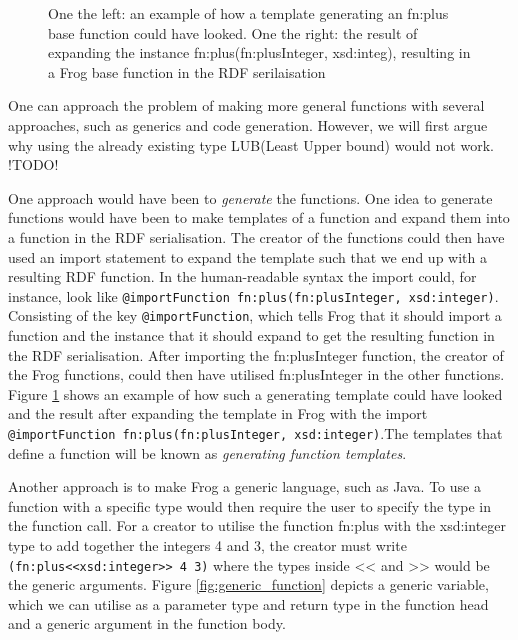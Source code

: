\begin{figure}
    \begin{minipage}{.5\textwidth}
      \centering
      
    \end{minipage}
    \begin{minipage}{.5\textwidth}
      \centering
      
    \end{minipage}
    \caption{One the left: an example of how a template generating an fn:plus base function could have looked. One the right: the result of expanding the instance fn:plus(fn:plusInteger, xsd:integ), resulting in a Frog base function in the RDF serilaisation}
    \label{fig:generating_function_example}
\end{figure}

\para
One can approach the problem of making more general functions with several approaches, such as generics and code generation. However, we will first argue why using the already existing type LUB(Least Upper bound) would not work. !TODO!

\para
One approach would have been to \emph{generate} the functions. One idea to generate functions would have been to make templates of a function and expand them into a function in the RDF serialisation. The creator of the functions could then have used an import statement to expand the template such that we end up with a resulting RDF function. In the human-readable syntax the import could, for instance, look like \lstinline{@importFunction fn:plus(fn:plusInteger, xsd:integer)}. Consisting of the key \lstinline{@importFunction}, which tells Frog that it should import a function and the instance that it should expand to get the resulting function in the RDF serialisation. After importing the fn:plusInteger function, the creator of the Frog functions, could then have utilised fn:plusInteger in the other functions. Figure \ref{fig:generating_function_example} shows an example of how such a generating template could have looked and the result after expanding the template in Frog with the import \lstinline{@importFunction fn:plus(fn:plusInteger, xsd:integer)}.The templates that define a function will be known as \emph{generating function templates}.

\para  
Another approach is to make Frog a generic language, such as Java. To use a function with a specific type would then require the user to specify the type in the function call. For a creator to utilise the function fn:plus with the xsd:integer type to add together the integers 4 and 3, the creator must write \lstinline{(fn:plus<<xsd:integer>> 4 3)} where the types inside << and >> would be the generic arguments. Figure \ref{fig:generic_function} depicts a generic variable, which we can utilise as a parameter type and return type in the function head and a generic argument in the function body.  

